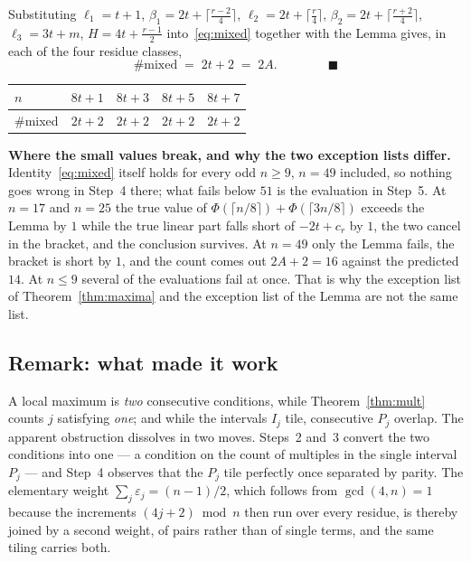 \documentclass[11pt,reqno]{amsart}
\theoremstyle{plain}
\theoremstyle{remark}
\numberwithin{equation}{section}
\begin{document}
Substituting $\ell_1 = t+1$, $\beta_1 = 2t+\lceil\frac{r-2}{4}\rceil$,
$\ell_2 = 2t+\lceil\frac{r}{4}\rceil$,
$\beta_2 = 2t+\lceil\frac{r+2}{4}\rceil$, $\ell_3 = 3t+m$,
$H = 4t+\frac{r-1}{2}$ into~\eqref{eq:mixed} together with the Lemma gives, in
each of the four residue classes,
\[
  \#\text{mixed} \;=\; 2t+2 \;=\; 2A. \qquad\qquad \blacksquare
\]

\begin{table}[h]
\centering
\begin{tabular}{l c c c c}
\toprule
$n$ & $8t+1$ & $8t+3$ & $8t+5$ & $8t+7$ \\
\midrule
$\#$mixed & $2t+2$ & $2t+2$ & $2t+2$ & $2t+2$ \\
\bottomrule
\end{tabular}
\end{table}

\medskip\noindent
\textbf{Where the small values break, and why the two exception lists differ.}
Identity~\eqref{eq:mixed} itself holds for every odd $n \ge 9$, $n = 49$
included, so nothing goes wrong in Step~4 there; what fails below $51$ is the
evaluation in Step~5. At $n = 17$ and $n = 25$ the true value of
$\Phi(\lceil n/8\rceil)+\Phi(\lceil 3n/8\rceil)$ exceeds the Lemma by $1$ while
the true linear part falls short of $-2t+c_r$ by $1$, the two cancel in the
bracket, and the conclusion survives. At $n = 49$ only the Lemma fails, the
bracket is short by $1$, and the count comes out $2A+2 = 16$ against the
predicted $14$. At $n \le 9$ several of the evaluations fail at once. That is
why the exception list of Theorem~\ref{thm:maxima} and the exception list of the
Lemma are not the same list.

\subsection{Remark: what made it work}

A local maximum is \emph{two} consecutive conditions, while
Theorem~\ref{thm:mult} counts $j$ satisfying \emph{one}; and while the intervals
$I_j$ tile, consecutive $P_j$ overlap. The apparent obstruction dissolves in two
moves. Steps~2 and~3 convert the two conditions into one --- a condition on the
count of multiples in the single interval $P_j$ --- and Step~4 observes that the
$P_j$ tile perfectly once separated by parity. The elementary weight
$\sum_j \varepsilon_j = (n-1)/2$, which follows from $\gcd(4,n)=1$ because the
increments $(4j+2) \bmod n$ then run over every residue, is thereby joined by a
second weight, of pairs rather than of single terms, and the same tiling carries
both.
\end{document}
